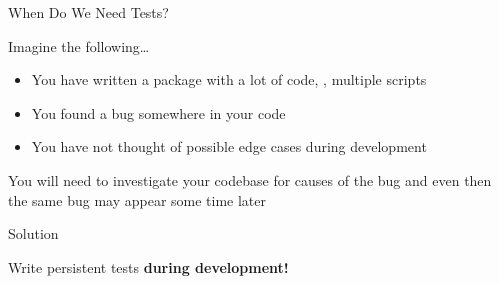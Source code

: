 
\begin{frame}{When Do We Need Tests?}
  \begin{center}
    \huge\textcolor{ccyan!90!cblack}{Imagine the following\dots}
  \end{center}
  \begin{itemize}
    \item You have written a package with a lot of code, \eg, multiple scripts
    \item You found a bug somewhere in your code
    \item You have not thought of possible edge cases during development
  \end{itemize}
  \vspace{1em}
  \begin{center}
    \huge\textcolor{cpink!90!cblack}{\to{} You will need to investigate your codebase for
    causes of the bug and even then the same bug may appear some time later}
  \end{center}
\end{frame}

\begin{frame}{Solution}
  \begin{center}
    \huge\textcolor{ccyan!90!cblack}{Write persistent tests \textbf{during development!}}\\

  \end{center}
\end{frame}

